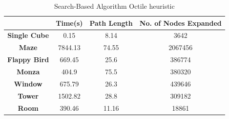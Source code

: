 \documentclass[conference]{IEEEtran}
\begin{document}
\begin{table}[h]
    \centering
    \caption{Search-Based Algorithm Octile heuristic}
    \label{tab:tab4}
    \begin{tabular}{|c|c|c|c|}
    \hline
    & \textbf{Time(s)} & \textbf{Path Length} & \textbf{No. of Nodes Expanded} \\ \hline
    \textbf{Single Cube} & 0.15 & 8.14 & 3642 \\ \hline
    \textbf{Maze} & 7844.13 & 74.55 & 2067456 \\ \hline %
    \textbf{Flappy Bird} & 669.45 & 25.6 & 386774 \\ \hline
    \textbf{Monza} & 404.9 & 75.5 & 380320 \\ \hline
    \textbf{Window} & 675.79 & 26.3 & 439646 \\ \hline
    \textbf{Tower} & 1502.82 & 28.8 & 309182 \\ \hline %
    \textbf{Room} & 390.46 & 11.16 & 18861 \\ \hline %
    \end{tabular}
\end{table}
\end{document}

